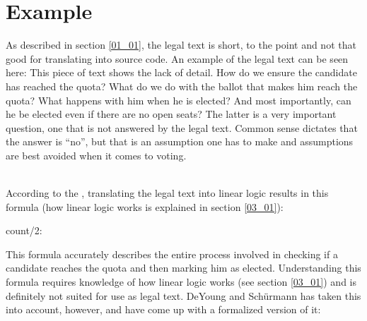 \section{Example}
\label{02_01}

As described in section \ref{01_01}, the legal text is short, to the point and not that good for translating into source code. An example of the legal text can be seen here:
This piece of text shows the lack of detail. How do we ensure the candidate has reached the quota? What do we do with the ballot that makes him reach the quota? What happens with him when he is elected? And most importantly, can he be elected even if there are no open seats? The latter is a very important question, one that is not answered by the legal text. Common sense dictates that the answer is “no”, but that is an assumption one has to make and assumptions are best avoided when it comes to voting.

 \\
According to the , translating the legal text into linear logic results in this formula (how linear logic works is explained in section \ref{03_01}):

\begin{texto2}
	count/2: \\
\end{texto2}

This formula accurately describes the entire process involved in checking if a candidate reaches the quota and then marking him as elected. Understanding this formula requires knowledge of how linear logic works (see section \ref{03_01}) and is definitely not suited for use as legal text. DeYoung and Schürmann has taken this into account, however, and have come up with a formalized version of it:


